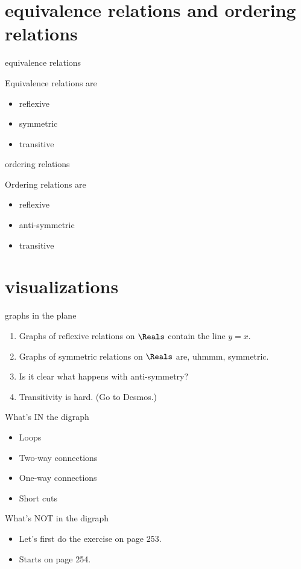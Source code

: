 \documentclass[handout,landscape]{beamer}
\begin{document}
\section{equivalence relations and ordering relations}

\begin{frame}{equivalence relations}

Equivalence relations are
\begin{itemize}
\item reflexive
\item symmetric
\item transitive
\end{itemize}

\end{frame}

\begin{frame}{ordering relations}

Ordering relations are
\begin{itemize}
\item reflexive
\item anti-symmetric
\item transitive
\end{itemize}
\end{frame}

\section{visualizations}

\begin{frame}{graphs in the plane}
\begin{enumerate}
\item Graphs of reflexive relations on $\Reals$ contain the line $y=x$. \pause
\item Graphs of symmetric relations on $\Reals$ are, uhmmm, symmetric. \pause
\item Is it clear what happens with anti-symmetry? \pause
\item Transitivity is hard. (Go to Desmos.)
\end{enumerate}
\end{frame}

\begin{frame}{What's IN the digraph}
\begin{itemize}
\item Loops\pause
\item Two-way connections\pause
\item One-way connections\pause
\item Short cuts
\end{itemize}
\end{frame}

\begin{frame}{What's NOT in the digraph}
\begin{itemize}
\item Let's first do the exercise on page 253. \pause
\item Starts on page 254.
\end{itemize}
\end{frame}
\end{document}

